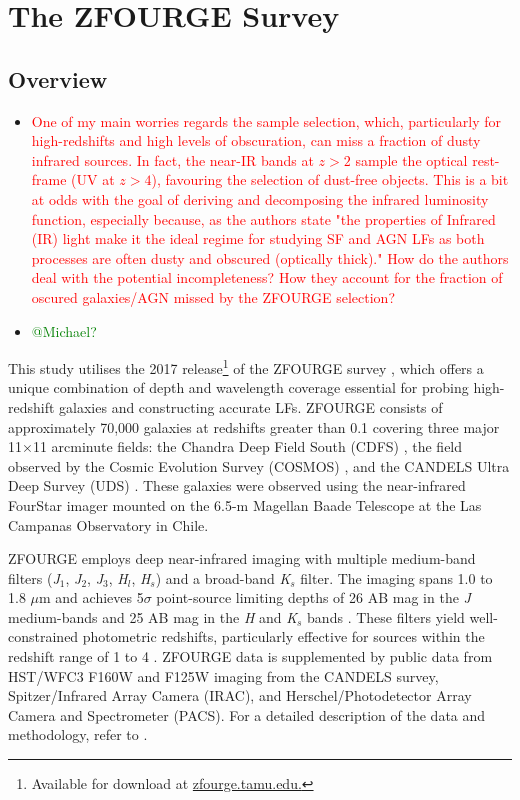 \section{The ZFOURGE Survey} \label{Sec: The ZFOURGE Survey}
\subsection{Overview}

\begin{itemize}
    \item \textcolor{red}{One of my main worries regards the sample selection, which, particularly for high-redshifts and high levels of obscuration, can miss a fraction of dusty infrared sources. In fact, the near-IR bands at $z>2$ sample the optical rest-frame (UV at $z>4$), favouring the selection of dust-free objects. This is a bit at odds with the goal of deriving and decomposing the infrared luminosity function, especially because, as the authors state "the properties of Infrared (IR) light make it the ideal regime for studying SF and AGN LFs as both processes are often dusty and obscured (optically thick)." How do the authors deal with the potential incompleteness? How they account for the fraction of oscured galaxies/AGN missed by the ZFOURGE selection?}

    \item \textcolor{Green}{@Michael?}
\end{itemize}


This study utilises the 2017 release\footnote{Available for download at \href{https://zfourge.tamu.edu/}{zfourge.tamu.edu.}} of the ZFOURGE survey \citep{straatman_fourstar_2016}, which offers a unique combination of depth and wavelength coverage essential for probing high-redshift galaxies and constructing accurate LFs. ZFOURGE consists of approximately 70,000 galaxies at redshifts greater than 0.1 covering three major 11$\times$11 arcminute fields: the Chandra Deep Field South (CDFS) \citep{giacconi_chandra_2002}, the field observed by the Cosmic Evolution Survey (COSMOS) \citep{scoville_cosmic_2007}, and the CANDELS Ultra Deep Survey (UDS) \citep{lawrence_ukirt_2007}. These galaxies were observed using the near-infrared FourStar imager \citep{persson_fourstar_2013} mounted on the 6.5-m Magellan Baade Telescope at the Las Campanas Observatory in Chile. 

ZFOURGE employs deep near-infrared imaging with multiple medium-band filters (\textit{J}$_{1}$, \textit{J}$_2$, \textit{J}$_{3}$, \textit{H}$_{l}$, \textit{H}$_{s}$) and a broad-band \textit{K}$_{s}$ filter. The imaging spans 1.0 to 1.8 $\mu$m and achieves 5$\sigma$ point-source limiting depths of 26 AB mag in the \textit{J} medium-bands and 25 AB mag in the \textit{H} and \textit{K}$_{s}$ bands \citep{spitler_first_2012}. These filters yield well-constrained photometric redshifts, particularly effective for sources within the redshift range of 1 to 4 \citep{spitler_first_2012}. ZFOURGE data is supplemented by public data from HST/WFC3 F160W and F125W imaging from the CANDELS survey, Spitzer/Infrared Array Camera (IRAC), and Herschel/Photodetector Array Camera and Spectrometer (PACS). For a detailed description of the data and methodology, refer to \cite{straatman_fourstar_2016}.


